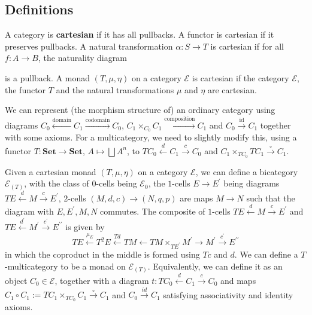 \documentclass{amsbook}
\newcommand{\Catb}[1]{\mathbf{#1}}
\newcommand{\SET}{\Catb{Set}}
\theoremstyle{definition}
\begin{document}
  \subsection{Definitions}
  A category is \textbf{cartesian} if it has all pullbacks. A functor is cartesian if it preserves pullbacks. A natural transformation $ \alpha: S \to T $ is cartesian if for all $ f: A \to B $, the naturality diagram
  \begin{center}
  \end{center}
  is a pullback. A monad $ (T, \mu, \eta) $ on a category $ \mathcal E $ is cartesian if the category $ \mathcal E $, the functor $ T $ and the natural transformations $ \mu $ and $ \eta $ are cartesian.

  We can represent (the morphism structure of) an ordinary category using diagrams $ C_0 \xleftarrow{\text{domain}} C_1 \xrightarrow{\text{codomain}} C_0 $, $ C_1 \times_{C_0} C_1 \xrightarrow{\text{composition}} C_1 $ and $ C_0 \xrightarrow{\text{id}} C_1 $ together with some axioms. For a multicategory, we need to slightly modify this, using a functor $ T: \SET \to \SET $, $ A \mapsto \bigsqcup A^n $, to $ T C_0 \xleftarrow{d} C_1 \xrightarrow{c} C_0 $ and $ C_1 \times_{T C_0} T C_1 \xrightarrow{\circ} C_1 $.

  Given a cartesian monad $ (T, \mu, \eta) $ on a category $ \mathcal E $, we can define a bicategory $ \mathcal E_{(T)} $, with the class of $ 0 $-cells being $ \mathcal E_0 $, the $ 1 $-cells $ E \to E^\prime $ being diagrams $ TE \xleftarrow{d} M \xrightarrow{c} E^\prime $, $ 2 $-cells $ (M, d, c) \to (N, q, p) $ are maps $ M \to N $ such that the diagram with $ E, E^\prime, M, N $ commutes. The composite of $ 1 $-cells $ TE \xleftarrow{d} M \xrightarrow{c} E^\prime $ and $ TE \xleftarrow{d^\prime} M^\prime \xrightarrow{c^\prime} E^{\prime\prime} $ is given by
  \[ T E \xleftarrow{\mu_E} T^2 E \xleftarrow{T d} TM \xleftarrow{} T M \times_{T E^\prime} M^\prime \xrightarrow{} M^\prime \xrightarrow{c^\prime} E^{\prime\prime} \]
  in which the coproduct in the middle is formed using $ T c $ and $ d $.
  We can define a $ T $-multicategory to be a monad on $ \mathcal E_{(T)} $. Equivalently, we can define it as an object $ C_0 \in \mathcal E $, together with a diagram $ t: T C_0 \xleftarrow{d} C_1 \xrightarrow{c} C_0 $ and maps $ C_1 \circ C_1 := T C_1 \times_{T C_0} C_1 \xrightarrow{\circ} C_1 $ and $ C_0 \xrightarrow{id} C_1 $ satisfying associativity and identity axioms.
\end{document}
